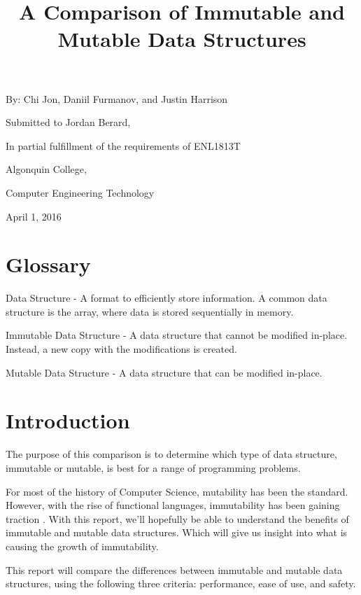 \documentclass[11pt]{article}
\title{A Comparison of Immutable and Mutable Data Structures}
\author{}
\date{}
\newcommand{\glossaryentry}[2]{#1 - #2}
\begin{document}
\maketitle

\begin{center}
By:  Chi Jon, Daniil Furmanov, and Justin Harrison

\hfill

Submitted to Jordan Berard,

In partial fulfillment of the requirements of ENL1813T

\hfill

Algonquin College,

Computer Engineering Technology

\hfill

April 1, 2016

\clearpage
\end{center}

\section*{Glossary}
\glossaryentry{Data Structure}{
  A format to efficiently store information. A common data
  structure is the array, where data is stored sequentially in memory.
}

\glossaryentry{Immutable Data Structure}{
  A data structure that cannot be modified in-place.
  Instead, a new copy with the modifications is created.
}

\glossaryentry{Mutable Data Structure}{
  A data structure that can be modified in-place.
}
\clearpage

\section*{Introduction}
The purpose of this comparison is to determine which type of data structure,
immutable or mutable, is best for a range of programming problems.

For most of the history of Computer Science, mutability has been the standard.
However, with the rise of functional languages, immutability has been gaining
traction \cite{ieee_spectrum}. With this report, we'll hopefully be able to
understand the benefits of immutable and mutable data structures. Which will
give us insight into what is causing the growth of immutability.

This report will compare the differences between immutable and mutable data
structures, using the following three criteria: performance, ease of use, and
safety.
\end{document}
